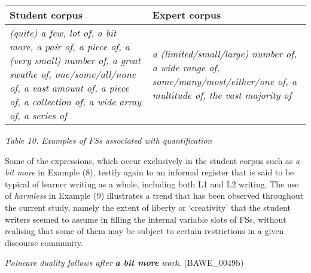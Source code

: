 \begin{center}
\tablefirsthead{}
\tablehead{}
\tabletail{}
\tablelasttail{}
\begin{supertabular}{m{2.4233599in}m{2.13866in}}
\hline
Student corpus &
Expert corpus\\\hline
\textit{(quite) a few, lot of, a bit more, a pair of, a piece of, a (very small) number of, a great swathe of, one/some/all/none of, a vast amount of, a piece of, a collection of, a wide array of, a series of} &
\textit{a (limited/small/large) number of, a wide range of, some/many/most/either/one of, a multitude of, the vast majority of}\\\hline
\end{supertabular}
\end{center}
\begin{styleStandard}
\textit{Table 10. Examples of FSs associated with quantification}
\end{styleStandard}

\begin{styleStandard}
Some of the expressions, which occur exclusively in the student corpus such as \textit{a bit more }in Example (8), testify again to an informal register that is said to be typical of learner writing as a whole, including both L1 and L2 writing. The use of \textit{harmless }in Example (9) illustrates a trend that has been observed throughout the current study, namely the extent of liberty or ‘creativity’ that the student writers seemed to assume in filling the internal variable slots of FSs, without realising that some of them may be subject to certain restrictions in a given discourse community. 
\end{styleStandard}

\begin{listWWNumxxixleveli}
\item 
\begin{styleListParagraph}
\textit{Poincare duality follows after }\textbf{\textit{a bit more}}\textit{ work}. (BAWE\_0049b)
\end{styleListParagraph}
\end{listWWNumxxixleveli}

